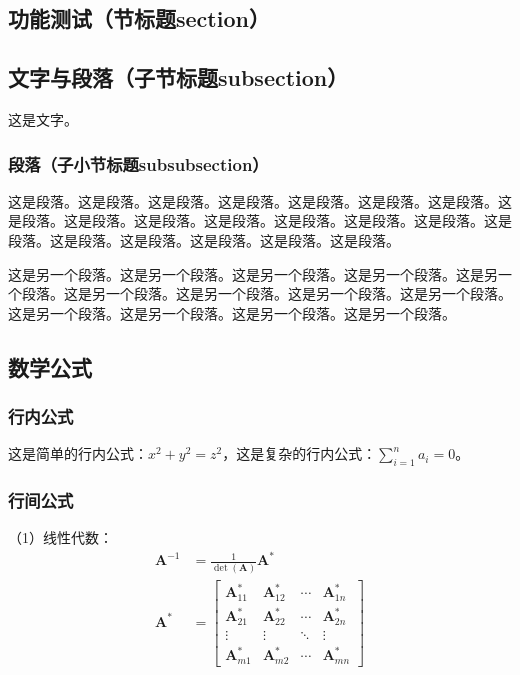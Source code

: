 \begin{ujnbody}
    \section{功能测试（节标题section）}
    \subsection{文字与段落（子节标题subsection）}
    这是文字。
    \subsubsection{段落（子小节标题subsubsection）}
    这是段落。这是段落。这是段落。这是段落。这是段落。这是段落。这是段落。这是段落。这是段落。这是段落。这是段落。这是段落。这是段落。这是段落。这是段落。这是段落。这是段落。这是段落。这是段落。这是段落。

    这是另一个段落。这是另一个段落。这是另一个段落。这是另一个段落。这是另一个段落。这是另一个段落。这是另一个段落。这是另一个段落。这是另一个段落。这是另一个段落。这是另一个段落。这是另一个段落。这是另一个段落。
    \subsection{数学公式}
    \subsubsection{行内公式}
    这是简单的行内公式：$x^2+y^2=z^2$，这是复杂的行内公式：$\sum_{i=1}^n a_i=0$。
    \subsubsection{行间公式}
    （1）线性代数：
    \begin{equation}
        \begin{split}
            \mathbf{A}^{-1} &= \frac{1}{\det(\mathbf{A})}\mathbf{A}^* \\
            \mathbf{A}^* &= \begin{bmatrix}
                \mathbf{A}_{11}^* & \mathbf{A}_{12}^* & \cdots & \mathbf{A}_{1n}^* \\
                \mathbf{A}_{21}^* & \mathbf{A}_{22}^* & \cdots & \mathbf{A}_{2n}^* \\
                \vdots & \vdots & \ddots & \vdots \\
                \mathbf{A}_{m1}^* & \mathbf{A}_{m2}^* & \cdots & \mathbf{A}_{mn}^*
            \end{bmatrix} \\
        \end{split}
    \end{equation}


\end{ujnbody}

